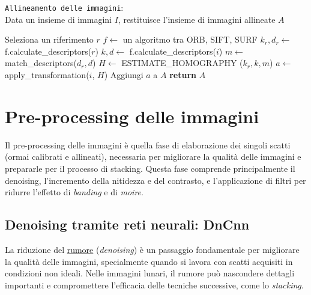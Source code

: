 \begin{algorithm}[H] \caption{\texttt{Allineamento delle immagini}:\\ Data un insieme di immagini $I$, restituisce l'insieme di immagini allineate $A$} \label{alg:align}
    \begin{algorithmic}[1]
            \State Seleziona un riferimento $r$ 
            \State $f \gets$ un algoritmo tra ORB, SIFT, SURF
            \State $k_{r}, d_{r} \gets$ f.calculate\_descriptors($r$) 
                \State $k, d \gets$ f.calculate\_descriptors($i$) 
                \State $m \gets$ match\_descriptors($d_{r}, d$) 
                \State $H \gets$ \small ESTIMATE\_HOMOGRAPHY \normalsize ($k_{r}, k, m$) 
                \State $a \gets$ apply\_transformation($i$, $H$) 
                \State Aggiungi $a$ a $A$
            \EndFor
            \State \textbf{return} $A$
        \EndFunction
    \end{algorithmic}
\end{algorithm}

\section{Pre-processing delle immagini} \label{sec:preprocessing}

Il pre-processing delle immagini è quella fase di elaborazione dei singoli scatti (ormai calibrati e allineati), necessaria per migliorare la qualità delle immagini e prepararle per il processo di stacking. Questa fase comprende principalmente il denoising, l'incremento della nitidezza e del contrasto, e l'applicazione di filtri per ridurre l'effetto di \textit{banding} e di \textit{moire}.

\subsection{Denoising tramite reti neurali: DnCnn} \label{subsec:denoising}

La riduzione del \hyperref[sec:noise]{rumore} (\textit{denoising}) è un passaggio fondamentale per migliorare la qualità delle immagini, specialmente quando si lavora con scatti acquisiti in condizioni non ideali. Nelle immagini lunari, il rumore può nascondere dettagli importanti e compromettere l'efficacia delle tecniche successive, come lo \textit{stacking}.

